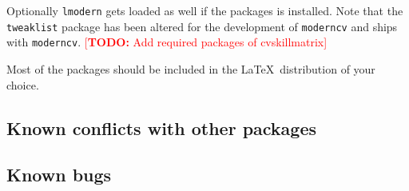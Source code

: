 \documentclass[a4paper,11pt]{article}
\newcommand{\todox}[1]{\textcolor{red}{[\textbf{TODO:} #1]}}
\newcommand{\code}[1]{\lstinline!#1!}
\newcommand{\Code}[1]{\lstinline!#1! } %
\newcommand{\moderncv}{\code{moderncv}}
\newcommand{\Moderncv}{\Code{moderncv}}
\begin{document}
Optionally \Code{lmodern} gets loaded as well if the packages is installed.
Note that the \Code{tweaklist} package has been altered for the development of \Moderncv and ships 
with \moderncv.
\todox{Add required packages of cvskillmatrix}

Most of the packages should be included in the \LaTeX\ distribution of your choice.

\subsection{Known conflicts with other packages}

\subsection{Known bugs}
\end{document}
